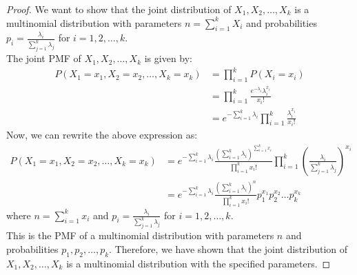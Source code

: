 \documentclass[openany]{book}
\begin{document}
\begin{proof}
    We want to show that the joint distribution of $X_1, X_2, \ldots, X_k$ is a multinomial distribution with parameters $n = \sum_{i=1}^{k} X_i$ and probabilities $p_i = \frac{\lambda_i}{\sum_{j=1}^{k} \lambda_j}$ for $i = 1, 2, \ldots, k$. \\
    The joint PMF of $X_1, X_2, \ldots, X_k$ is given by:
    \begin{align*}
        P(X_1 = x_1, X_2 = x_2, \ldots, X_k = x_k) &= \prod_{i=1}^{k} P(X_i = x_i) \\
        &= \prod_{i=1}^{k} \frac{e^{-\lambda_i} \lambda_i^{x_i}}{x_i!} \\
        &= e^{-\sum_{i=1}^{k} \lambda_i} \prod_{i=1}^{k} \frac{\lambda_i^{x_i}}{x_i!}
    \end{align*}
    Now, we can rewrite the above expression as:
    \begin{align*}
        P(X_1 = x_1, X_2 = x_2, \ldots, X_k = x_k) &= e^{-\sum_{i=1}^{k} \lambda_i} \frac{(\sum_{i=1}^{k} \lambda_i)^{\sum_{i=1}^{k} x_i}}{\prod_{i=1}^{k} x_i!} \prod_{i=1}^{k} \left( \frac{\lambda_i}{\sum_{j=1}^{k} \lambda_j} \right)^{x_i} \\
        &= e^{-\sum_{i=1}^{k} \lambda_i} \frac{(\sum_{i=1}^{k} \lambda_i)^{n}}{\prod_{i=1}^{k} x_i!} p_1^{x_1} p_2^{x_2} \ldots p_k^{x_k}
    \end{align*}
    where $n = \sum_{i=1}^{k} x_i$ and $p_i = \frac{\lambda_i}{\sum_{j=1}^{k} \lambda_j}$ for $i = 1, 2, \ldots, k$. \\
    This is the PMF of a multinomial distribution with parameters $n$ and probabilities $p_1, p_2, \ldots, p_k$. Therefore, we have shown that the joint distribution of $X_1, X_2, \ldots, X_k$ is a multinomial distribution with the specified parameters.
\end{proof}
\end{document}
